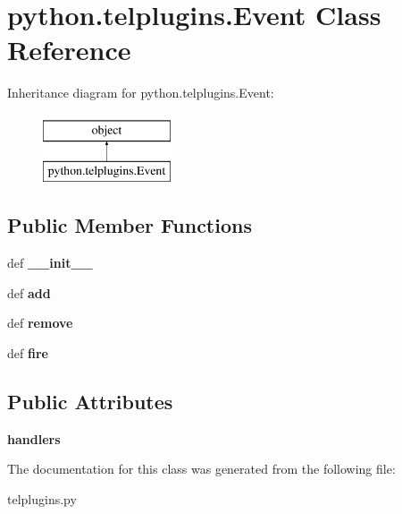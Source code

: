 \hypertarget{classpython_1_1telplugins_1_1_event}{\section{python.\-telplugins.\-Event Class Reference}
\label{classpython_1_1telplugins_1_1_event}
}
Inheritance diagram for python.\-telplugins.\-Event\-:\begin{figure}[H]
\begin{center}
\leavevmode
\includegraphics[height=2.000000cm]{classpython_1_1telplugins_1_1_event}
\end{center}
\end{figure}
\subsection*{Public Member Functions}
\begin{DoxyCompactItemize}
\item 
\hypertarget{classpython_1_1telplugins_1_1_event_a484bfa984ab105ff6ad449d20d09314a}{def {\bfseries \-\_\-\-\_\-init\-\_\-\-\_\-}}\label{classpython_1_1telplugins_1_1_event_a484bfa984ab105ff6ad449d20d09314a}

\item 
\hypertarget{classpython_1_1telplugins_1_1_event_ae4ccc23552c51df57dc1b77bfabcbb7e}{def {\bfseries add}}\label{classpython_1_1telplugins_1_1_event_ae4ccc23552c51df57dc1b77bfabcbb7e}

\item 
\hypertarget{classpython_1_1telplugins_1_1_event_afe249d309b85952f8f87ebf78e2227b1}{def {\bfseries remove}}\label{classpython_1_1telplugins_1_1_event_afe249d309b85952f8f87ebf78e2227b1}

\item 
\hypertarget{classpython_1_1telplugins_1_1_event_a038ac78d0d08e23c39671071e56ace72}{def {\bfseries fire}}\label{classpython_1_1telplugins_1_1_event_a038ac78d0d08e23c39671071e56ace72}

\end{DoxyCompactItemize}
\subsection*{Public Attributes}
\begin{DoxyCompactItemize}
\item 
\hypertarget{classpython_1_1telplugins_1_1_event_a5d2a24fa4fa288afb4416ab85a4f3fc3}{{\bfseries handlers}}\label{classpython_1_1telplugins_1_1_event_a5d2a24fa4fa288afb4416ab85a4f3fc3}

\end{DoxyCompactItemize}


The documentation for this class was generated from the following file\-:\begin{DoxyCompactItemize}
\item 
telplugins.\-py\end{DoxyCompactItemize}
